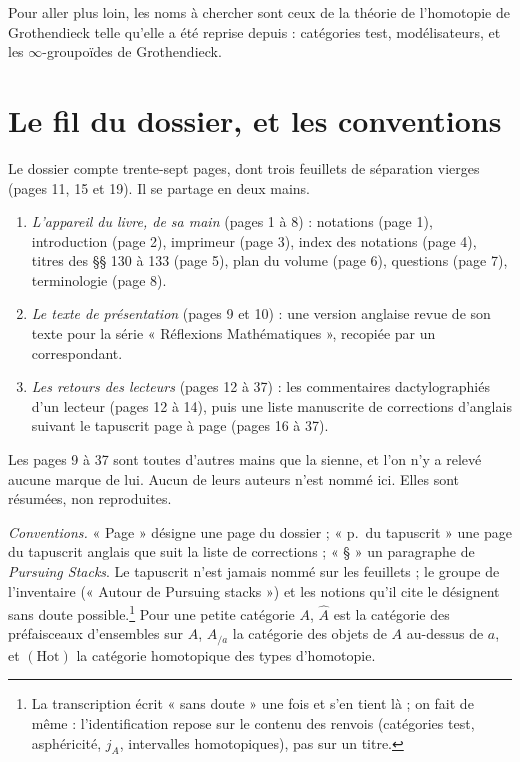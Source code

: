 \documentclass[11pt,a4paper]{article}
\begin{document}
\begin{resume}
Pour aller plus loin, les noms à chercher sont ceux de la théorie de
l'homotopie de Grothendieck telle qu'elle a été reprise depuis : catégories
test, modélisateurs, et les $\infty$-groupoïdes de Grothendieck.

\end{resume}

\section*{Le fil du dossier, et les conventions}

Le dossier compte trente-sept pages, dont trois feuillets de séparation
vierges (pages 11, 15 et 19). Il se partage en deux mains.

\begin{enumerate}
\item[1.] \emph{L'appareil du livre, de sa main} (pages 1 à 8) : notations
(page 1), introduction (page 2), imprimeur (page 3), index des notations
(page 4), titres des §§ 130 à 133 (page 5), plan du volume (page 6), questions
(page 7), terminologie (page 8).
\item[2.] \emph{Le texte de présentation} (pages 9 et 10) : une version
anglaise revue de son texte pour la série « Réflexions Mathématiques »,
recopiée par un correspondant.
\item[3.] \emph{Les retours des lecteurs} (pages 12 à 37) : les commentaires
dactylographiés d'un lecteur (pages 12 à 14), puis une liste manuscrite de
corrections d'anglais suivant le tapuscrit page à page (pages 16 à 37).
\end{enumerate}

Les pages 9 à 37 sont toutes d'autres mains que la sienne, et l'on n'y a
relevé aucune marque de lui. Aucun de leurs auteurs n'est nommé ici. Elles sont
résumées, non reproduites.

\emph{Conventions.} « Page » désigne une page du dossier ; « p.\ du
tapuscrit » une page du tapuscrit anglais que suit la liste de corrections ;
« § » un paragraphe de \emph{Pursuing Stacks}. Le tapuscrit n'est jamais
nommé sur les feuillets ; le groupe de l'inventaire (« Autour de Pursuing
stacks ») et les notions qu'il cite le désignent sans doute
possible.\footnote{La transcription écrit « sans doute » une fois et s'en
tient là ; on fait de même : l'identification repose sur le contenu des renvois
(catégories test, asphéricité, $j_{A}$, intervalles homotopiques), pas sur un
titre.}
Pour une petite catégorie $A$, $\widehat{A}$ est la catégorie des
préfaisceaux d'ensembles sur $A$, $A_{/a}$ la catégorie des objets de $A$
au-dessus de $a$, et $(\mathrm{Hot})$ la catégorie homotopique des types
d'homotopie.
\end{document}
